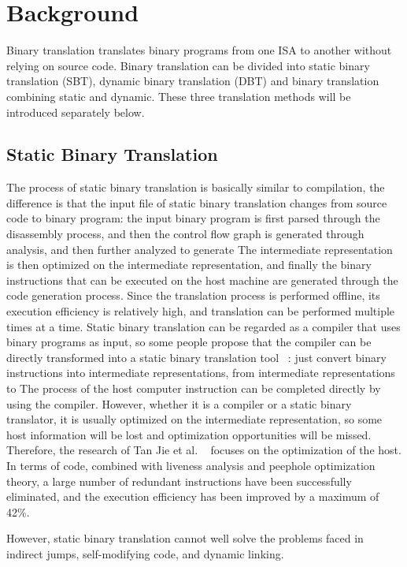\section{Background}
\label{sec:background}

Binary translation translates binary programs from one ISA to another without relying on source code. 
Binary translation can be divided into static binary translation (SBT), dynamic binary translation (DBT) and binary translation combining static and dynamic. 
These three translation methods will be introduced separately below.

\subsection{Static Binary Translation}
The process of static binary translation is basically similar to compilation, the difference is that the input file of static binary translation changes from source code to binary program: 
the input binary program is first parsed through the disassembly process, and then the control flow graph is generated through analysis, and then further analyzed to generate The intermediate representation is then optimized on the intermediate representation, and finally the binary instructions that can be executed on the host machine are generated through the code generation process.
Since the translation process is performed offline, its execution efficiency is relatively high, and translation can be performed multiple times at a time.
Static binary translation can be regarded as a compiler that uses binary programs as input, so some people propose that the compiler can be directly transformed into a static binary translation tool ~\cite{Hwang2010DisIRerCA}: 
just convert binary instructions into intermediate representations, from intermediate representations to The process of the host computer instruction can be completed directly by using the compiler. 
However, whether it is a compiler or a static binary translator, it is usually optimized on the intermediate representation, so some host information will be lost and optimization opportunities will be missed. 
Therefore, the research of Tan Jie et al. ~\cite{TanJie2017ISSN} focuses on the optimization of the host. 
In terms of code, combined with liveness analysis and peephole optimization theory, a large number of redundant instructions have been successfully eliminated, and the execution efficiency has been improved by a maximum of 42\%.

However, static binary translation cannot well solve the problems faced in indirect jumps, self-modifying code, and dynamic linking.

